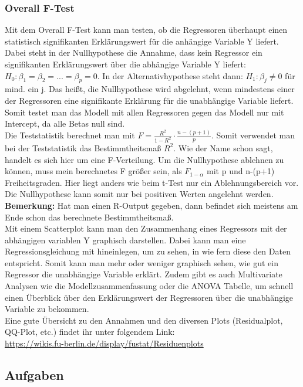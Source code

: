 \documentclass[a4paper]{article}
\begin{document}
\subsubsection{Overall F-Test}
Mit dem Overall F-Test kann man testen, ob die Regressoren überhaupt einen statistisch signifikanten Erklärungswert für die anhängige Variable Y liefert. Dabei steht in der Nullhypothese die Annahme, dass kein Regressor ein signifikanten Erklärungswert über die abhängige Variable Y liefert: $H_0:\beta_1=\beta_2=...=\beta_p=0$. In der Alternativhypothese steht dann: $H_1:\beta_j\neq0$ für mind. ein j. Das heißt, die Nullhypothese wird abgelehnt, wenn mindestens einer der Regressoren eine signifikante Erklärung für die unabhängige Variable liefert. Somit testet man das Modell mit allen Regressoren gegen das Modell nur mit Intercept, da alle Betas null sind.\\
Die Teststatistik berechnet man mit $F=\frac{R^2}{1-R^2}\cdot \frac{n-(p+1)}{p}$. Somit verwendet man bei der Teststatistik das Bestimmtheitsmaß $R^2$. Wie der Name schon sagt, handelt es sich hier um eine F-Verteilung. Um die Nullhypothese ablehnen zu können, muss mein berechnetes F größer sein, als $F_{1-\alpha}$ mit p und n-(p+1) Freiheitsgraden. Hier liegt anders wie beim t-Test nur ein Ablehnungsbereich vor. Die Nullhypothese kann somit nur bei positiven Werten angelehnt werden.\\
\textbf{Bemerkung:} Hat man einen R-Output gegeben, dann befindet sich meistens am Ende schon das berechnete Bestimmtheitsmaß.\\
Mit einem Scatterplot kann man den Zusammenhang eines Regressors mit der abhängigen variablen Y graphisch darstellen. Dabei kann man eine Regressionsgleichung mit hineinlegen, um zu sehen, in wie fern diese den Daten entspricht. Somit kann man mehr oder weniger graphisch sehen, wie gut ein Regressor die unabhängige Variable erklärt. Zudem gibt es auch Multivariate Analysen wie die Modellzusammenfassung oder die ANOVA Tabelle, um schnell einen Überblick über den Erklärungswert der Regressoren über die unabhängige Variable zu bekommen.\\

\noindent Eine gute Übersicht zu den Annahmen und den diversen Plots (Residualplot, QQ-Plot, etc.) findet ihr unter folgendem Link:\\
\url{https://wikis.fu-berlin.de/display/fustat/Residuenplots}

\clearpage
\subsection{Aufgaben}
\end{document}
